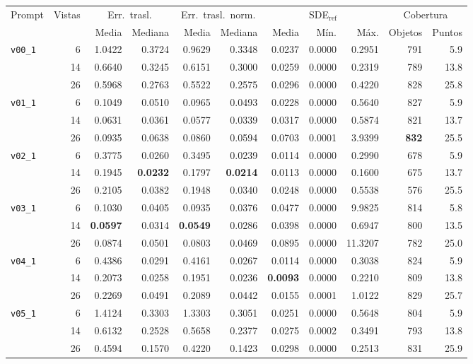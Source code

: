 \begin{table}[H]
\vspace{2ex}

\begin{tabular*}{\textwidth}{@{\extracolsep{\fill}}lrrrrrrrrrr@{}}
\toprule
\multirow{2}{*}{Prompt} & \multirow{2}{*}{Vistas} & \multicolumn{2}{c}{Err.\ trasl.} & \multicolumn{2}{c}{Err.\ trasl.\ norm.} & \multicolumn{3}{c}{SDE$_{\mathrm{ref}}$} & \multicolumn{2}{c}{Cobertura} \\
\cmidrule(lr){3-4} \cmidrule(lr){5-6} \cmidrule(lr){7-9} \cmidrule(lr){10-11}
 &  & Media & Mediana & Media & Mediana & Media & Mín. & Máx. & Objetos & Puntos \\
\midrule
\multirow{3}{*}{\texttt{v00\_1}} & 6 & 1.0422 & 0.3724 & 0.9629 & 0.3348 & 0.0237 & 0.0000 & 0.2951 & 791 & 5.9 \\
 & 14 & 0.6640 & 0.3245 & 0.6151 & 0.3000 & 0.0259 & 0.0000 & 0.2319 & 789 & 13.8 \\
 & 26 & 0.5968 & 0.2763 & 0.5522 & 0.2575 & 0.0296 & 0.0000 & 0.4220 & 828 & 25.8 \\
\midrule
\multirow{3}{*}{\texttt{v01\_1}} & 6 & 0.1049 & 0.0510 & 0.0965 & 0.0493 & 0.0228 & 0.0000 & 0.5640 & 827 & 5.9 \\
 & 14 & 0.0631 & 0.0361 & 0.0577 & 0.0339 & 0.0317 & 0.0000 & 0.5874 & 821 & 13.7 \\
 & 26 & 0.0935 & 0.0638 & 0.0860 & 0.0594 & 0.0703 & 0.0001 & 3.9399 & \textbf{832} & 25.5 \\
\midrule
\multirow{3}{*}{\texttt{v02\_1}} & 6 & 0.3775 & 0.0260 & 0.3495 & 0.0239 & 0.0114 & 0.0000 & 0.2990 & 678 & 5.9 \\
 & 14 & 0.1945 & \textbf{0.0232} & 0.1797 & \textbf{0.0214} & 0.0113 & 0.0000 & 0.1600 & 675 & 13.7 \\
 & 26 & 0.2105 & 0.0382 & 0.1948 & 0.0340 & 0.0248 & 0.0000 & 0.5538 & 576 & 25.5 \\
\midrule
\multirow{3}{*}{\texttt{v03\_1}} & 6 & 0.1030 & 0.0405 & 0.0935 & 0.0376 & 0.0477 & 0.0000 & 9.9825 & 814 & 5.8 \\
 & 14 & \textbf{0.0597} & 0.0314 & \textbf{0.0549} & 0.0286 & 0.0398 & 0.0000 & 0.6947 & 800 & 13.5 \\
 & 26 & 0.0874 & 0.0501 & 0.0803 & 0.0469 & 0.0895 & 0.0000 & 11.3207 & 782 & 25.0 \\
\midrule
\multirow{3}{*}{\texttt{v04\_1}} & 6 & 0.4386 & 0.0291 & 0.4161 & 0.0267 & 0.0114 & 0.0000 & 0.3038 & 824 & 5.9 \\
 & 14 & 0.2073 & 0.0258 & 0.1951 & 0.0236 & \textbf{0.0093} & 0.0000 & 0.2210 & 809 & 13.8 \\
 & 26 & 0.2269 & 0.0491 & 0.2089 & 0.0442 & 0.0155 & 0.0001 & 1.0122 & 829 & 25.7 \\
\midrule
\multirow{3}{*}{\texttt{v05\_1}} & 6 & 1.4124 & 0.3303 & 1.3303 & 0.3051 & 0.0251 & 0.0000 & 0.5648 & 804 & 5.9 \\
 & 14 & 0.6132 & 0.2528 & 0.5658 & 0.2377 & 0.0275 & 0.0002 & 0.3491 & 793 & 13.8 \\
 & 26 & 0.4594 & 0.1570 & 0.4220 & 0.1423 & 0.0298 & 0.0000 & 0.2513 & 831 & 25.9 \\
\bottomrule
\end{tabular*}


\end{table}
